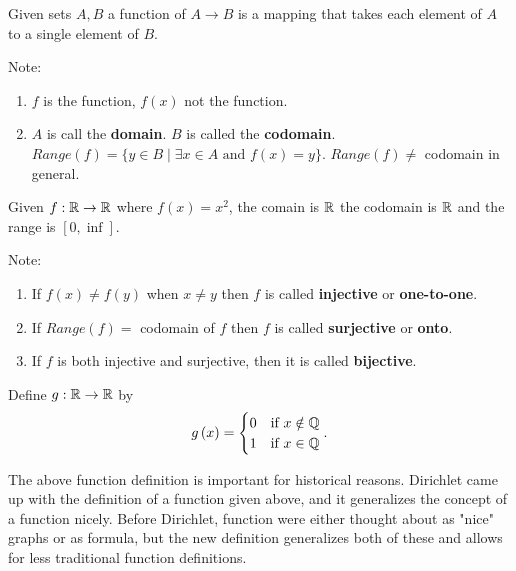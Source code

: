 

\begin{definition}
	Given sets $A, B$ a function of $A \to B$ is a mapping that takes each element of $A$ to a single element of $B$.
\end{definition}

Note: 

\begin{enumerate}
	\item $f$ is the function, $f\left( x \right)$ not the function.
	\item $A$ is call the \textbf{domain}. $B$ is called the  \textbf{codomain}. $Range\left( f \right) = \{y \in B  \mid  \exists x \in A  \text{ and } f\left( x \right) = y\}$. $Range\left( f \right) \neq$ codomain in general.
\end{enumerate}

\begin{eg}
	Given $f : \mathbb{R} \to \mathbb{R}$ where  $f\left( x \right) = x^{2}$, the comain is $\mathbb{R}$ the codomain is $\mathbb{R}$ and the range is $[0, \inf]$. 
\end{eg}


Note:
\begin{enumerate}
	\item If $f\left( x \right) \neq f\left( y \right)$ when $x \neq  y$ then $f$ is called \textbf{injective} or \textbf{one-to-one}.
	\item If $Range\left( f \right) =$ codomain of $f$ then $f$ is called \textbf{surjective} or \textbf{onto}.
	\item If $f$ is both injective and surjective, then it is called \textbf{bijective}.
\end{enumerate}	

\begin{eg}
	Define $g: \mathbb{R} \to \mathbb{R}$ by
	\[
		g\left( x \right) =
		\begin{cases}
			0 & \text{if } x \notin  \mathbb{Q} \\
			1 & \text{if } x \in \mathbb{Q} 
		\end{cases}	
	.\]

	The above function definition is important for historical reasons. Dirichlet came up with the definition of a function given above, and it generalizes the concept of a function nicely. Before Dirichlet, function were either thought about as "nice" graphs or as formula, but the new definition generalizes both of these and allows for less traditional function definitions.
\end{eg}

